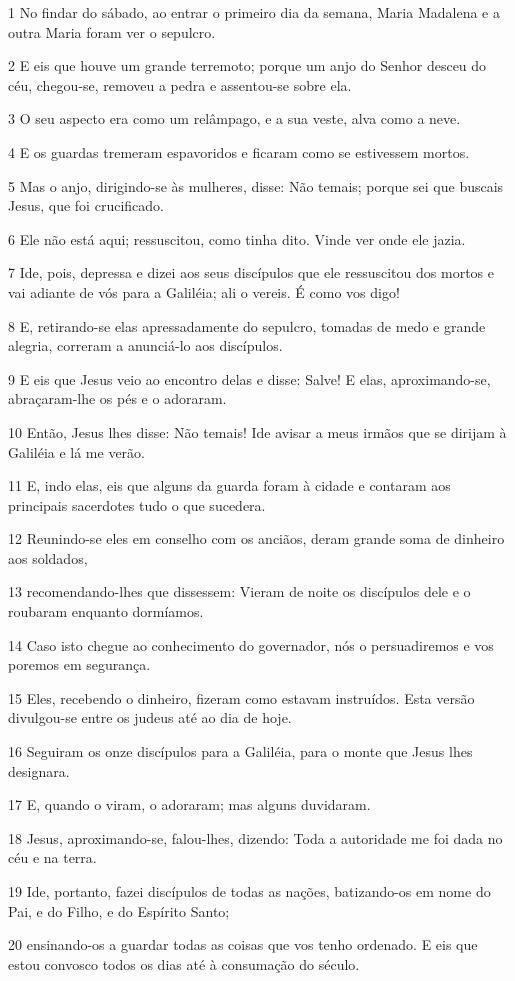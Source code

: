 \par 1 No findar do sábado, ao entrar o primeiro dia da semana, Maria Madalena e a outra Maria foram ver o sepulcro.
\par 2 E eis que houve um grande terremoto; porque um anjo do Senhor desceu do céu, chegou-se, removeu a pedra e assentou-se sobre ela.
\par 3 O seu aspecto era como um relâmpago, e a sua veste, alva como a neve.
\par 4 E os guardas tremeram espavoridos e ficaram como se estivessem mortos.
\par 5 Mas o anjo, dirigindo-se às mulheres, disse: Não temais; porque sei que buscais Jesus, que foi crucificado.
\par 6 Ele não está aqui; ressuscitou, como tinha dito. Vinde ver onde ele jazia.
\par 7 Ide, pois, depressa e dizei aos seus discípulos que ele ressuscitou dos mortos e vai adiante de vós para a Galiléia; ali o vereis. É como vos digo!
\par 8 E, retirando-se elas apressadamente do sepulcro, tomadas de medo e grande alegria, correram a anunciá-lo aos discípulos.
\par 9 E eis que Jesus veio ao encontro delas e disse: Salve! E elas, aproximando-se, abraçaram-lhe os pés e o adoraram.
\par 10 Então, Jesus lhes disse: Não temais! Ide avisar a meus irmãos que se dirijam à Galiléia e lá me verão.
\par 11 E, indo elas, eis que alguns da guarda foram à cidade e contaram aos principais sacerdotes tudo o que sucedera.
\par 12 Reunindo-se eles em conselho com os anciãos, deram grande soma de dinheiro aos soldados,
\par 13 recomendando-lhes que dissessem: Vieram de noite os discípulos dele e o roubaram enquanto dormíamos.
\par 14 Caso isto chegue ao conhecimento do governador, nós o persuadiremos e vos poremos em segurança.
\par 15 Eles, recebendo o dinheiro, fizeram como estavam instruídos. Esta versão divulgou-se entre os judeus até ao dia de hoje.
\par 16 Seguiram os onze discípulos para a Galiléia, para o monte que Jesus lhes designara.
\par 17 E, quando o viram, o adoraram; mas alguns duvidaram.
\par 18 Jesus, aproximando-se, falou-lhes, dizendo: Toda a autoridade me foi dada no céu e na terra.
\par 19 Ide, portanto, fazei discípulos de todas as nações, batizando-os em nome do Pai, e do Filho, e do Espírito Santo;
\par 20 ensinando-os a guardar todas as coisas que vos tenho ordenado. E eis que estou convosco todos os dias até à consumação do século.


